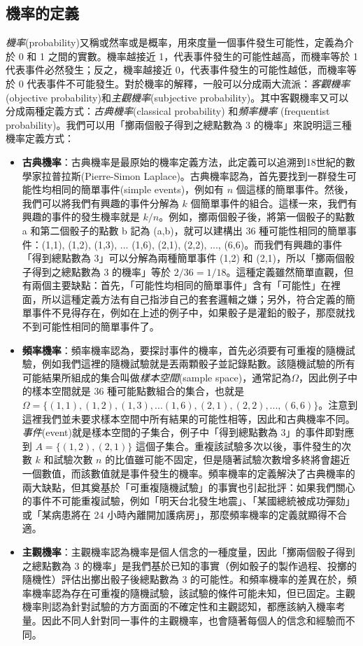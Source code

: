 \subsection{機率的定義}
    \textit{機率}(probability)又稱或然率或是概率，用來度量一個事件發生可能性，定義為介於 0 和 1 之間的實數。機率越接近 1，代表事件發生的可能性越高，而機率等於 1 代表事件必然發生；反之，機率越接近 0，代表事件發生的可能性越低，而機率等於 0 代表事件不可能發生。對於機率的解釋，一般可以分成兩大流派：\textit{客觀機率}(objective probability)和\textit{主觀機率}(subjective probability)。其中客觀機率又可以分成兩種定義方式：\textit{古典機率}(classical probability) 和\textit{頻率機率} (frequentist probability)。我們可以用「擲兩個骰子得到之總點數為 3 的機率」來說明這三種機率定義方式：
    \begin{itemize}\sloppy
        \item \textbf{古典機率}：古典機率是最原始的機率定義方法，此定義可以追溯到18世紀的數學家拉普拉斯(Pierre-Simon Laplace)。古典機率認為，首先要找到一群發生可能性均相同的簡單事件(simple events)，例如有 $n$ 個這樣的簡單事件。然後，我們可以將我們有興趣的事件分解為 $k$ 個簡單事件的組合。這樣一來，我們有興趣的事件的發生機率就是 $k/n$。例如，擲兩個骰子後，將第一個骰子的點數 a 和第二個骰子的點數 b 記為 (a,b)，就可以建構出 36 種可能性相同的簡單事件：(1,1), (1,2), (1,3), ... (1,6), (2,1), (2,2), ..., (6,6)。而我們有興趣的事件「得到總點數為 3」可以分解為兩種簡單事件 (1,2) 和 (2,1)，所以「擲兩個骰子得到之總點數為 3 的機率」等於 $2/36 = 1/18$。這種定義雖然簡單直觀，但有兩個主要缺點：首先，「可能性均相同的簡單事件」含有「可能性」在裡面，所以這種定義方法有自己指涉自己的套套邏輯之嫌；另外，符合定義的簡單事件不見得存在，例如在上述的例子中，如果骰子是灌鉛的骰子，那麼就找不到可能性相同的簡單事件了。
        \item \textbf{頻率機率}：頻率機率認為，要探討事件的機率，首先必須要有可重複的隨機試驗，例如我們這裡的隨機試驗就是丟兩顆骰子並記錄點數。該隨機試驗的所有可能結果所組成的集合叫做\textit{樣本空間}(sample space)，通常記為$\Omega$，因此例子中的樣本空間就是 36 種可能點數組合的集合，也就是 $\Omega = \{(1,1), (1,2), (1,3), ... (1,6), (2,1), (2,2), ..., (6,6)\}$。注意到這裡我們並未要求樣本空間中所有結果的可能性相等，因此和古典機率不同。\textit{事件}(event)就是樣本空間的子集合，例子中「得到總點數為 3」的事件即對應到 $A = \{(1,2),(2,1)\}$ 這個子集合。重複該試驗多次以後，事件發生的次數 $k$ 和試驗次數 $n$ 的比值雖可能不固定，但是隨著試驗次數增多終將會趨近一個數值，而該數值就是事件發生的機率。頻率機率的定義解決了古典機率的兩大缺點，但其奠基於「可重複隨機試驗」的事實也引起批評：如果我們關心的事件不可能重複試驗，例如「明天台北發生地震」、「某國總統被成功彈劾」或「某病患將在 24 小時內離開加護病房」，那麼頻率機率的定義就顯得不合適。
        \item \textbf{主觀機率}：主觀機率認為機率是個人信念的一種度量，因此「擲兩個骰子得到之總點數為 3 的機率」是我們基於已知的事實（例如骰子的製作過程、投擲的隨機性）評估出擲出骰子後總點數為 3 的可能性。和頻率機率的差異在於，頻率機率認為存在可重複的隨機試驗，該試驗的條件可能未知，但已固定。主觀機率則認為針對試驗的方方面面的不確定性和主觀認知，都應該納入機率考量。因此不同人針對同一事件的主觀機率，也會隨著每個人的信念和經驗而不同。
    \end{itemize}
